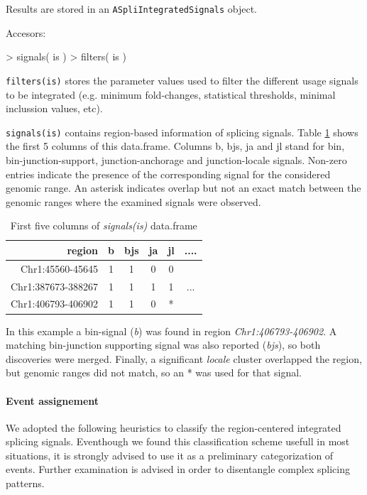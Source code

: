 \documentclass{article}
\begin{document}
Results are stored in an \texttt{ASpliIntegratedSignals} object.

Accesors:

\begin{Schunk}
\begin{Sinput}
>  signals( is )
>  filters( is )
\end{Sinput}
\end{Schunk}

\texttt{filters(is)} stores the parameter values used to filter the different usage signals to be integrated (e.g. minimum fold-changes, statistical thresholds, minimal inclussion values, etc).  


\texttt{signals(is)} contains region-based information of splicing signals. Table \ref{tab:iiss} shows the first 5 columns of this data.frame. Columns b, bjs, ja and jl stand for bin, bin-junction-support, junction-anchorage and junction-locale signals. Non-zero entries indicate the presence of the corresponding signal for the considered genomic range.  An asterisk indicates overlap but not an exact match between the genomic ranges where the examined signals were observed.


\begin{table}[H]
  \begin{center}
    \begin{tabular}{rccccc}
              region & b & bjs & ja & jl & ....\\ \hline
 Chr1:45560-45645   & 1 & 1 & 0  & 0 &\\
 Chr1:387673-388267 & 1 & 1 & 1  & 1 & ...\\
 Chr1:406793-406902 & 1 & 1 & 0  & * &\\  
    \end{tabular}
  \end{center}
  \caption{First five columns of {\em signals(is)} data.frame}
  \label{tab:iiss}
\end{table}

In this example a bin-signal ({\em b}) was found in region {\em Chr1:406793-406902}. A matching bin-junction supporting signal was also reported ({\em bjs}), so both discoveries were merged. Finally, a significant {\em locale} cluster overlapped the region, but genomic ranges did not match, so an * was used for that signal.

\paragraph{Event assignement} We adopted the following heuristics to classify the region-centered integrated splicing signals. Eventhough we found this classification scheme usefull in most situations, it is strongly advised to use it as a preliminary categorization of events. Further examination is advised in order to disentangle complex splicing patterns. 
\end{document}
